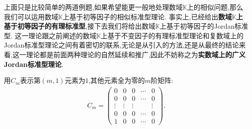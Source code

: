 \documentclass[../../main.tex]{subfiles}%
\begin{document}
\vspace{0.5cm}

上面只是比较简单的两道例题,如果希望能更一般地处理数域$\mathbb{K}$上的相似问题,那么我们可以运用数域$\mathbb{K}$上基于初等因子的相似标准型理论. 事实上,已经给出\textbf{数域$\mathbb{K}$上基于初等因子的有理标准型},接下去我们将给出数域$\mathbb{K}$上基于初等因子的Jordan标准型. 这一理论跟之前阐述的数域$\mathbb{K}$上基于不变因子的有理标准型理论和复数域上的Jordan标准型理论之间有着密切的联系,无论是从引入的方法,还是从最终的结论来看,这一理论都是前面两种理论的自然延续和推广,因此不妨称之为\textbf{实数域上的广义Jordan标准型理论}. 

\vspace{0.5cm}

\begin{definition}
用$C_m$表示第$(m,1)$元素为$1$,其他元素全为零的$m$阶矩阵:
\begin{align*}
C_m = 
\begin{pmatrix}
0 & 0 & 0 & \cdots & 0 \\
0 & 0 & 0 & \cdots & 0 \\
\vdots & \vdots & \vdots & & \vdots \\
0 & 0 & 0 & \cdots & 0 \\
1 & 0 & 0 & \cdots & 0
\end{pmatrix}.
\end{align*}
\end{definition}
\end{document}
